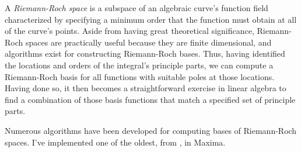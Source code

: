 A {\it Riemann-Roch space} is a subspace of an algebraic curve's
function field characterized by specifying a minimum order that the
function must obtain at all of the curve's points.  Aside from having
great theoretical significance, Riemann-Roch spaces are practically
useful because they are finite dimensional, and algorithms exist for
constructing Riemann-Roch bases.  Thus, having identified the
locations and orders of the integral's principle parts, we can compute
a Riemann-Roch basis for all functions with suitable poles at those
locations.  Having done so, it then becomes a straightforward exercise
in linear algebra to find a combination of those basis functions
that match a specified set of principle parts.

Numerous algorithms have been developed for computing bases
of Riemann-Roch spaces.  I've implemented one of the oldest,
from \cite{bliss}, in Maxima.

